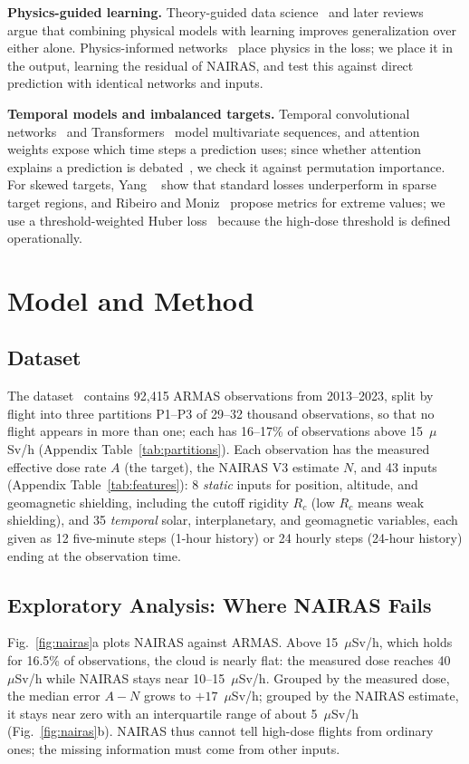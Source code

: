 \documentclass[10pt,twocolumn,letterpaper]{article}
\begin{document}
\textbf{Physics-guided learning.}
Theory-guided data science~\cite{karpatne2017} and later
reviews~\cite{willard2022,reichstein2019} argue that combining physical models
with learning improves generalization over either alone. Physics-informed
networks~\cite{raissi2019,karniadakis2021} place physics in the loss; we
place it in the output, learning the residual of NAIRAS, and test this against
direct prediction with identical networks and inputs.

\textbf{Temporal models and imbalanced targets.}
Temporal convolutional networks~\cite{bai2018} and
Transformers~\cite{vaswani2017,lim2021} model multivariate sequences, and
attention weights expose which time steps a prediction uses; since whether
attention explains a prediction is debated~\cite{jain2019,wiegreffe2019}, we
check it against permutation importance. For
skewed targets, Yang \etal~\cite{yang2021} show that standard losses
underperform in sparse target regions, and Ribeiro and
Moniz~\cite{ribeiro2020} propose metrics for extreme values; we use a threshold-weighted Huber
loss~\cite{huber1964} because the high-dose threshold is defined
operationally.

\section{Model and Method}
\label{sec:method}

\subsection{Dataset}
\label{sec:data}
The dataset~\cite{sadykov2026} contains 92,415 ARMAS observations from
2013--2023, split by flight into three partitions P1--P3 of 29--32 thousand
observations, so that no flight appears in more than one; each has
16--17\% of observations above 15~$\mu$Sv/h (Appendix
Table~\ref{tab:partitions}). Each observation has the measured effective dose
rate $A$ (the target), the NAIRAS V3 estimate $N$, and 43 inputs (Appendix
Table~\ref{tab:features}): 8 \emph{static} inputs for position, altitude, and
geomagnetic shielding, including the cutoff rigidity $R_c$ (low $R_c$ means
weak shielding), and 35 \emph{temporal} solar, interplanetary, and
geomagnetic variables, each given as 12 five-minute steps (1-hour history)
or 24 hourly steps (24-hour history) ending at the observation time.

\subsection{Exploratory Analysis: Where NAIRAS Fails}
\label{sec:eda}
Fig.~\ref{fig:nairas}a plots NAIRAS against ARMAS. Above 15~$\mu$Sv/h, which
holds for 16.5\% of observations, the cloud is nearly flat: the measured dose
reaches 40~$\mu$Sv/h while NAIRAS stays near 10--15~$\mu$Sv/h. Grouped by the
measured dose, the median error $A-N$ grows to $+17$~$\mu$Sv/h; grouped by
the NAIRAS estimate, it stays near zero with an interquartile range of about
5~$\mu$Sv/h (Fig.~\ref{fig:nairas}b). NAIRAS thus cannot tell high-dose
flights from ordinary ones; the missing information must come from other inputs.
\end{document}
